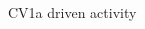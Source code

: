 \documentclass[aspectratio=43]{beamer}
\begin{document}
\begin{frame}{CV1a driven activity}
{\begin{columns}
\begin{column}{0.5\textwidth}
			\end{column}
		\end{columns}
	}	
	
\end{frame}
%
\end{document}
